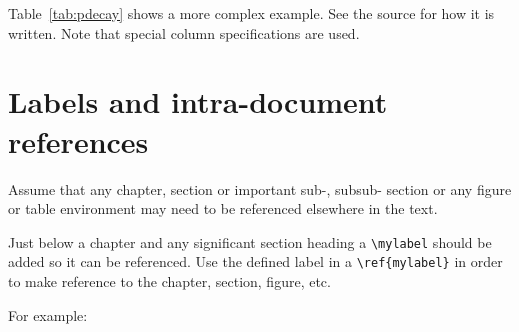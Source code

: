 Table~\ref{tab:pdecay} shows a more complex example.
See the source for how it is written.
Note that special column specifications are used.


\FloatBarrier



\section{Labels and intra-document references}
\label{sec:latex-intra-doc-ref}

Assume that any chapter, section or important sub-, subsub- section
or any figure or table environment may need to be referenced
elsewhere in the text. 

Just below a chapter and any significant section heading a
\verb|\mylabel| should be added so it can be referenced. Use the defined label in a \verb|\ref{mylabel}| in order to make reference
to the chapter, section, figure, etc.

For example:

